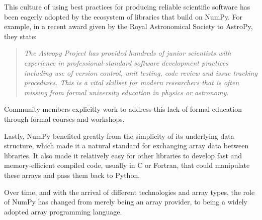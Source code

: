 This culture of using best practices for producing reliable scientific software has been eagerly adopted by the ecosystem of libraries that build on NumPy.  For example, in a recent award given by the Royal Astronomical Society to AstroPy, they state:
\begin{quotation}
\noindent\emph{The Astropy Project has provided hundreds of junior scientists with experience in professional-standard software development practices including use of version control, unit testing, code review and issue tracking procedures. This is a vital skillset for modern researchers that is often missing from formal university education in physics or astronomy.}
\end{quotation}
Community members explicitly work to address this lack of formal education through formal courses and workshops\cite{wilson-software-carpentry,hannay-scientific-software-survey,millman2018teaching}.

Lastly, NumPy benefited greatly from the simplicity of its underlying data structure, which made it a natural standard for exchanging array data between libraries.  It also made it relatively easy for other
libraries to develop fast and memory-efficient compiled code, usually in C or
Fortran, that could manipulate these arrays and pass them back to Python.

Over time, and with the arrival of different technologies and array types, the role of NumPy has changed from merely being an array provider, to being a widely adopted array programming language.


%
%
%
%
%
%

